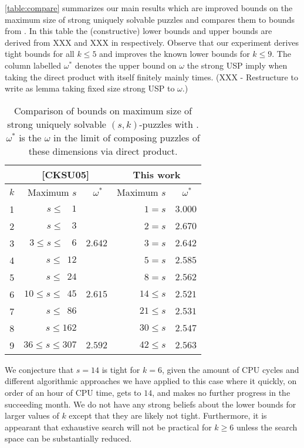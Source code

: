 \documentclass[11pt]{article}
\begin{document}
\autoref{table:compare} summarizes our main results which are improved
bounds on the maximum size of strong uniquely solvable puzzles and
compares them to bounds from \cite{cksu05}.  In this table the
(constructive) lower bounds and upper bounds are derived from XXX and
XXX in \cite{cksu05} respectively.  Observe that our experiment
derives tight bounds for all $k \le 5$ and improves the known lower
bounds for $k \le 9$.  The column labelled $\omega^*$ denotes the
upper bound on $\omega$ the strong USP imply when taking the direct
product with itself finitely mainly times. (XXX - Restructure to write
as lemma taking fixed size strong USP to $\omega$.)
\begin{table}
  \label{table:compare}
  \begin{center}
  \begin{tabular}{|c|r|r|r|r|}
    \hline
    & \multicolumn{2}{|c|}{[CKSU05]} & \multicolumn{2}{|c|}{This work} \\
    \hline
    $k$ & Maximum $s$ & $\omega^*$~ & Maximum $s$ & $\omega^*$~\\
    \hline
    1 & $s\le ~~~~1$ & & $1=s$ & $3.000$  \\
    2 & $s\le ~~~~3$ & & $2=s$ & $2.670$ \\
    3 & $3 \le s \le ~~~~6$ & $2.642$ & $3=s$ & $2.642$ \\
    4 & $s\le ~~12$ & & $5=s$ & $2.585$ \\
    5 & $s\le ~~24$ & & $8=s$ & $2.562$  \\
    6 & $10 \le s \le ~~45$ & $2.615$ &$14\le s$ & $2.521$\\
    7 & $s\le ~~86$ & & $21\le s$ & $2.531$ \\
    8 & $s\le 162$ & & $30\le s$ & $2.547$ \\
    9 & $36 \le s \le 307$ & $2.592$ &$42\le s$ & $2.563$  \\
    \hline
  \end{tabular}
  \end{center}
  \caption{Comparison of bounds on maximum size of strong uniquely
    solvable $(s,k)$-puzzles with \cite{cksu05}.  $\omega^*$ is the
    $\omega$ in the limit of composing puzzles of these dimensions via
    direct product.}
\end{table}

We conjecture that $s = 14$ is tight for $k = 6$, given the amount of
CPU cycles and different algorithmic approaches we have applied to
this case where it quickly, on order of an hour of CPU time, gets to
$14$, and makes no further progress in the succeeding month.  We do
not have any strong beliefs about the lower bounds for larger values
of $k$ except that they are likely not tight.  Furthermore, it is
appearant that exhaustive search will not be practical for $k \ge 6$
unless the search space can be substantially reduced.
\end{document}
